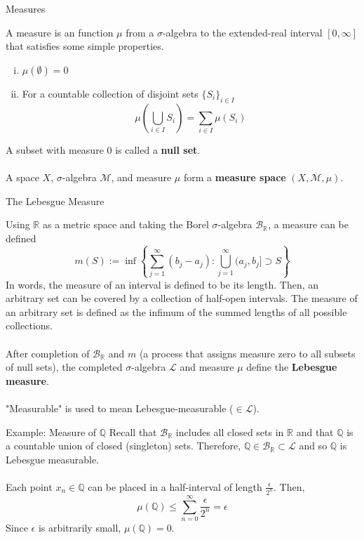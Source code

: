 \documentclass{beamer}
\begin{document}
\begin{frame}{Measures}

    A measure is an function $\mu$ from a $\sigma$-algebra to 
    the extended-real interval $[0,\infty]$ that satisfies some simple properties.
    \begin{enumerate}[(i)]
        \item $\mu(\emptyset) = 0$
        \item For a countable collection of disjoint sets $\{S_i\}_{i \in I}$
        \[\mu\left(\bigcup_{i\in I} S_i\right) = \sum_{i\in I} \mu(S_i)\]
    \end{enumerate}

    A subset with measure 0 is called a \textbf{null set}.
    \\~\\
    A space $X$, $\sigma$-algebra $\mathcal{M}$, and 
    measure $\mu$ form a \textbf{measure space}
    $(X, \mathcal{M}, \mu)$.

\end{frame}

\begin{frame}{The Lebesgue Measure}

    Using $\mathbb{R}$ as a metric space and taking the Borel
    $\sigma$-algebra $\mathcal{B}_\mathbb{R}$, a measure can
    be defined
    \[
       m(S) := \inf\left\{\sum_{j=1}^{\infty}\left(b_j-a_j\right) : \bigcup_{j=1}^{\infty}(a_j,b_j] \supset S\right\} 
    \] 
    In words, the measure of an interval is defined to be its length. Then, an arbitrary set can
    be covered by a collection of half-open intervals. The measure of an 
    arbitrary set is defined as the infimum of the summed lengths of all possible collections.
    \\~\\
    After completion of $\mathcal{B}_\mathbb{R}$ and $m$
    (a process that assigns measure zero to all subsets of null sets),
    the completed $\sigma$-algebra $\mathcal{L}$ and measure $\mu$ define
    the \textbf{Lebesgue measure}. 
    \\~\\
    "Measurable" is used to mean Lebesgue-measurable ($\in \mathcal{L}$).

\end{frame}

\begin{frame}{Example: Measure of $\mathbb{Q}$}
Recall that $\mathcal{B}_\mathbb{R}$ includes all closed sets in $\mathbb{R}$ and that
$\mathbb{Q}$ is a countable union of closed (singleton) sets.
Therefore, $\mathbb{Q} \in \mathcal{B}_\mathbb{R} \subset \mathcal{L}$
and so $\mathbb{Q}$ is Lebesgue measurable. 
\\~\\
Each point $x_n \in \mathbb{Q}$ can be placed in a half-interval of length 
$\frac{\epsilon}{2^n}$. Then,
\[
    \mu(\mathbb{Q}) \leq \sum_{n=0}^{\infty} \frac{\epsilon}{2^n} = \epsilon
\]
Since $\epsilon$ is arbitrarily small, $\mu(\mathbb{Q}) = 0$. 
\end{frame}
\end{document}
